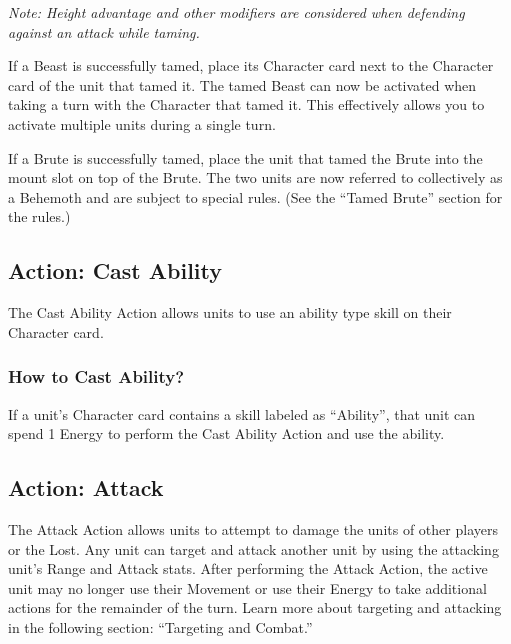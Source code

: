 \documentclass[../main.tex]{subfiles}
\begin{document}
\textit{Note: Height advantage and other modifiers are considered when defending against an attack while taming.}

If a Beast is successfully tamed, place its Character card next to the Character card of the unit that tamed it. The tamed Beast can now be activated when taking a turn with the Character that tamed it. This effectively allows you to activate multiple units during a single turn. 

If a Brute is successfully tamed, place the unit that tamed the Brute into the mount slot on top of the Brute. The two units are now referred to collectively as a Behemoth and are subject to special rules. (See the “Tamed Brute” section for the rules.)

\subsection{Action: Cast Ability}
The Cast Ability Action allows units to use an ability type skill on their Character card.

\subsubsection{How to Cast Ability?}
If a unit’s Character card contains a skill labeled as “Ability”, that unit can spend 1 Energy to perform the Cast Ability Action and use the ability.

\subsection{Action: Attack}
The Attack Action allows units to attempt to damage the units of other players or the Lost. Any unit can target and attack another unit by using the attacking unit’s Range and Attack stats. After performing the Attack Action, the active unit may no longer use their Movement or use their Energy to take additional actions for the remainder of the turn. Learn more about targeting and attacking in the following section: “Targeting and Combat.”

\clearpage
\end{document}
